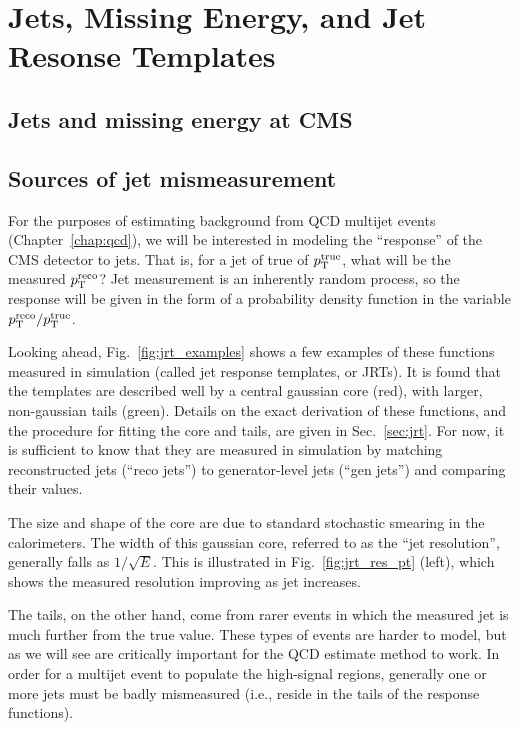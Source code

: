 \chapter{Jets, Missing Energy, and Jet Resonse Templates}

\section{Jets and missing energy at CMS}


\section{Sources of jet mismeasurement}
For the purposes of estimating background from QCD multijet events (Chapter~\ref{chap:qcd}),
we will be interested in modeling the ``response'' of the CMS detector to jets.
That is, for a jet of true \pt of $p_{\mathrm{T}}^{\mathrm{true}}$, what will be the
measured $p_{\mathrm{T}}^{\mathrm{reco}}$? Jet measurement is an inherently random process, so the response
will be given in the form of a probability density function in the variable
$p_{\mathrm{T}}^{\mathrm{reco}}/p_{\mathrm{T}}^{\mathrm{true}}$. 

Looking ahead, Fig.~\ref{fig:jrt_examples} shows a 
few examples of these functions measured in simulation (called jet response templates, or JRTs).
It is found that the templates are described well by a central gaussian core (red),
with larger, non-gaussian tails (green).
Details on the exact derivation of these functions, and the procedure for fitting
the core and tails, are given in Sec.~\ref{sec:jrt}. For now, it is sufficient
to know that they are measured in simulation by matching reconstructed jets
(``reco jets'') to generator-level jets (``gen jets'') and comparing their \pt values.

The size and shape of the core are due to standard stochastic smearing in the calorimeters. 
The width of this gaussian core, referred to
as the ``jet resolution'', generally falls as $1/\sqrt{E}$. This is illustrated in 
Fig.~\ref{fig:jrt_res_pt} (left), which shows the measured
resolution improving as jet \pt increases.

The tails, on the other hand, come from rarer events in which the measured jet \pt 
is much further from the true value. These types of events
are harder to model, but as we will see are critically important for the 
QCD estimate method to work. In order for a multijet event to populate the high-\ptmiss signal regions, 
generally one or more jets must be badly mismeasured
(i.e., reside in the tails of the response functions).

